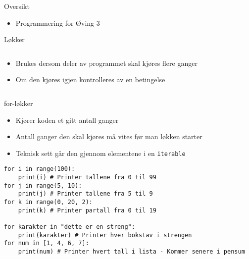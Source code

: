 \documentclass[screen, aspectratio=169]{beamer}
\begin{document}
\begin{frame}{Oversikt}
	\begin{itemize}
		\item Programmering for Øving 3
	\end{itemize}
\end{frame}

\begin{frame}{Løkker}
	\begin{columns}
		\begin{column}{.4\textwidth}
			\begin{itemize}
				\item Brukes dersom deler av programmet skal kjøres flere ganger
				\item Om den kjøres igjen kontrolleres av en betingelse
			\end{itemize}
		\end{column}
		\begin{column}{.6\textwidth}
			\raggedright
		\end{column}
	\end{columns}
\end{frame}

\begin{frame}[fragile]{for-løkker}
	\begin{itemize}
		\item Kjører koden et gitt antall ganger
		\item Antall ganger den skal kjøres må vites før man løkken starter
		\item Teknisk sett går den gjennom elementene i en \lstinline|iterable|
	\end{itemize}
	\vspace{-1em}
	\begin{lstlisting}
for i in range(100):
	print(i) # Printer tallene fra 0 til 99
for j in range(5, 10):
	print(j) # Printer tallene fra 5 til 9
for k in range(0, 20, 2):
	print(k) # Printer partall fra 0 til 19
	
for karakter in "dette er en streng":
	print(karakter) # Printer hver bokstav i strengen
for num in [1, 4, 6, 7]:
	print(num) # Printer hvert tall i lista - Kommer senere i pensum
	\end{lstlisting}
\end{frame}
\end{document}
